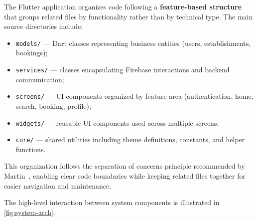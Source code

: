 The Flutter application organizes code following a \textbf{feature-based structure} that groups related files by functionality rather than by technical type.
The main source directories include:

\begin{itemize}
  \item \texttt{models/} --- Dart classes representing business entities (users, establishments, bookings);
  \item \texttt{services/} --- classes encapsulating Firebase interactions and backend communication;
  \item \texttt{screens/} --- UI components organized by feature area (authentication, home, search, booking, profile);
  \item \texttt{widgets/} --- reusable UI components used across multiple screens;
  \item \texttt{core/} --- shared utilities including theme definitions, constants, and helper functions.
\end{itemize}

This organization follows the separation of concerns principle recommended by Martin~\cite{martin2017}, enabling clear code boundaries while keeping related files together for easier navigation and maintenance.

The high-level interaction between system components is illustrated in \cref{fig:system-arch}.

